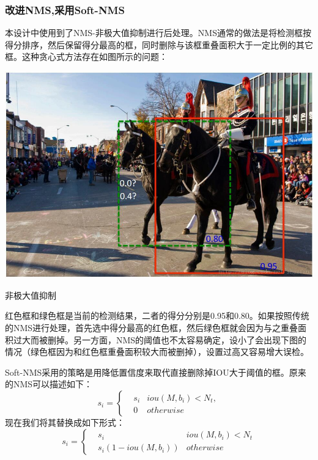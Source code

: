 \subsubsection{改进NMS,采用Soft-NMS}
本设计中使用到了NMS-非极大值抑制\cite{nms}进行后处理。NMS通常的做法是将检测框按得分排序，然后保留得分最高的框，同时删除与该框重叠面积大于一定比例的其它框。这种贪心式方法存在如图所示的问题： 
\begin{uscfigure}
	\includegraphics[width=\textwidth]{./Pictures/soft-nms.jpeg}	
	\caption{非极大值抑制}
	\label{soft-nms}
\end{uscfigure}
红色框和绿色框是当前的检测结果，二者的得分分别是0.95和0.80。如果按照传统的NMS进行处理，首先选中得分最高的红色框，然后绿色框就会因为与之重叠面积过大而被删掉。另一方面，NMS的阈值也不太容易确定，设小了会出现下图的情况（绿色框因为和红色框重叠面积较大而被删掉），设置过高又容易增大误检。

Soft-NMS采用的策略是用降低置信度来取代直接删除掉IOU大于阈值的框。原来的NMS可以描述如下：
\begin{equation}
s_i=\left\{
\begin{aligned}
& s_i 	&iou(M,b_i) < N_t,\\
& 0 	&otherwise
\end{aligned}
\right.
\end{equation}
现在我们将其替换成如下形式：
\begin{equation}
s_i=\left\{
\begin{aligned}
& s_i 	&iou(M, b_i) < N_t\\
& s_i(1 - iou(M, b_i)) 	&otherwise
\end{aligned}
\right.
\end{equation}